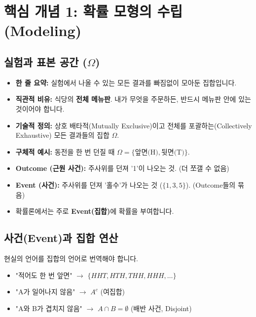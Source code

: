 \documentclass[11pt,a4paper]{book}
\theoremstyle{definition}
\begin{document}
\section{핵심 개념 1: 확률 모형의 수립 (Modeling)}

\subsection{실험과 표본 공간 ($\Omega$)}
\begin{conceptbox}[title={표본 공간은 우리가 노는 '운동장'이다}]
\begin{itemize}
    \item \textbf{한 줄 요약:} 실험에서 나올 수 있는 모든 결과를 빠짐없이 모아둔 집합입니다.
    \item \textbf{직관적 비유:} 식당의 \textbf{전체 메뉴판}. 내가 무엇을 주문하든, 반드시 메뉴판 안에 있는 것이어야 합니다.
    \item \textbf{기술적 정의:} 상호 배타적(Mutually Exclusive)이고 전체를 포괄하는(Collectively Exhaustive) 모든 결과들의 집합 $\Omega$.
    \item \textbf{구체적 예시:} 동전을 한 번 던질 때 $\Omega = \{ \text{앞면(H)}, \text{뒷면(T)} \}$.
\end{itemize}
\end{conceptbox}

\begin{warningbox}[title={Outcome vs Event 구분하기}]
\begin{itemize}
    \item \textbf{Outcome (근원 사건):} 주사위를 던져 '1'이 나오는 것. (더 쪼갤 수 없음)
    \item \textbf{Event (사건):} 주사위를 던져 '홀수'가 나오는 것 ($\{1, 3, 5\}$). (Outcome들의 묶음)
    \item 확률론에서는 주로 \textbf{Event(집합)}에 확률을 부여합니다.
\end{itemize}
\end{warningbox}

\subsection{사건(Event)과 집합 연산}
현실의 언어를 집합의 언어로 번역해야 합니다.
\begin{itemize}
    \item "적어도 한 번 앞면" $\rightarrow$ $\{HHT, HTH, THH, HHH, \dots\}$
    \item "A가 일어나지 않음" $\rightarrow$ $A^c$ (여집합)
    \item "A와 B가 겹치지 않음" $\rightarrow$ $A \cap B = \emptyset$ (배반 사건, Disjoint)
\end{itemize}
\end{document}
